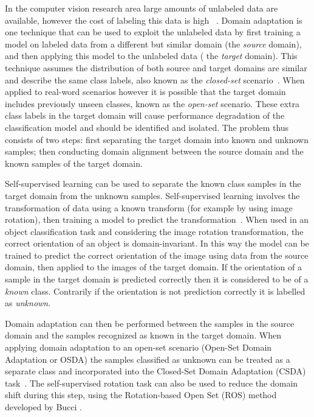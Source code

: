 \documentclass[10pt,twocolumn,letterpaper]{article}
\begin{document}
In the computer vision research area large amounts of unlabeled data are available, however the cost of labeling this data is high ~\cite{Csurka2017, Zhang2016}. Domain adaptation is one technique that can be used to exploit the unlabeled data by first training a model on labeled data from a different but similar domain (the \textit{source} domain), and then applying this model to the unlabeled data ( the \textit{target} domain). This technique assumes the distribution of both source and target domains are similar and describe the same class labels, also known as the \textit{closed-set} scenario~\cite{Bucci2020}. When applied to real-word scenarios however it is possible that the target domain includes previously unseen classes, known as the \textit{open-set} scenario. These extra class labels in the target domain will cause performance degradation of the classification model and should be identified and isolated. The problem thus consists of two steps: first separating the target domain into known and unknown samples; then conducting domain alignment between the source domain and the known samples of the target domain. 

Self-supervised learning can be used to separate the known class samples in the target domain from the unknown samples. Self-supervised learning involves the transformation of data using a known transform (for example by using image rotation), then training a model to predict the transformation~\cite{Xu2019}. When used in an object classification task and considering the image rotation transformation, the correct orientation of an object is domain-invariant. In this way the model can be trained to predict the correct orientation of the image using data from the source domain, then applied to the images of the target domain. If the orientation of a sample in the target domain is predicted correctly then it is considered to be of a \textit{known} class. Contrarily if the orientation is not prediction correctly it is labelled as \textit{unknown}. 

Domain adaptation can then be performed between the samples in the source domain and the samples recognized as known in the target domain. When applying domain adaptation to an open-set scenario (Open-Set Domain Adaptation or OSDA) the samples classified as unknown can be treated as a separate class and incorporated into the Closed-Set Domain Adaptation (CSDA) task~\cite{Pau2020}. The self-supervised rotation task can also be used to reduce the domain shift during this step, using the Rotation-based Open Set (ROS) method developed by Bucci \etal \cite{Bucci2020}.
\end{document}
